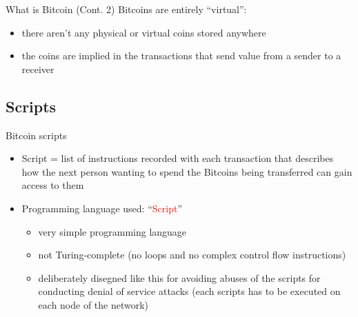 \documentclass{beamer}
\newcommand\red[1]{\textcolor{red}{#1}}
\begin{document}
  \begin{frame}{What is Bitcoin (Cont. 2)}
    Bitcoins are entirely ``virtual'':
    \begin{itemize}
      \item there aren't any physical or virtual coins stored anywhere 
      \item the coins are implied in the transactions that send value from a sender to
      a receiver
    \end{itemize}
  \end{frame}





  \subsection{Scripts}
  \begin{frame}{Bitcoin scripts}
    \begin{itemize}
      \item Script = list of instructions recorded with each transaction that describes
      how the next person wanting to spend the Bitcoins being transferred can gain access to them \pause 
      \item Programming language used: ``\red{Script}'' \cite{script-bitcoin-wiki} 
      \begin{itemize}
        \item very simple programming language 
        \item not Turing-complete {\tiny(no loops and no complex control flow instructions)} 
        \item deliberately disegned like this for avoiding abuses of the scripts
        for conducting denial of service attacks {\tiny(each scripts has to be
        executed on each node of the network)}
      \end{itemize}
    \end{itemize}
  \end{frame}
\end{document}
